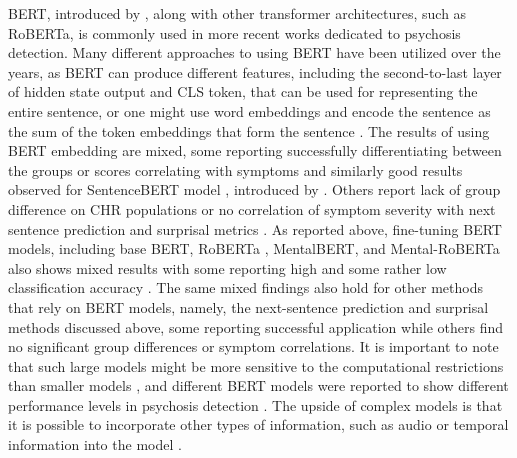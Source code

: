 BERT, introduced by \citet{devlin2018bert}, along with other transformer architectures, such as RoBERTa, is commonly used in more recent works dedicated to psychosis detection. Many different approaches to using BERT have been utilized over the years, as BERT can produce different features, including the second-to-last layer of hidden state output and CLS token, that can be used for representing the entire sentence, or one might use word embeddings and encode the sentence as the sum of the token embeddings that form the sentence \citep{xu2022fully}. The results of using BERT embedding are mixed, some reporting successfully differentiating between the groups or scores correlating with symptoms \citep{ryazanskaya2020automated, xu2022fully, srivastava2022p473} and similarly good results observed for SentenceBERT model \citep{xu2022fully}, introduced by \citet{reimers2019sentence}. Others report lack of group difference on CHR populations \citep{hitczenko2021understanding, bilgrami2022construct} or no correlation of symptom severity with next sentence prediction and surprisal metrics \citep{jeong2023exploring}. As reported above, fine-tuning BERT models, including base BERT, RoBERTa \citep{liu2019roberta}, MentalBERT, and Mental-RoBERTa \citep{ji2021mentalbert} also shows mixed results with some reporting high \citep{wouts2021belabbert, shriki2022masking} and some rather low classification accuracy \citep{aich2022towards}. The same mixed findings also hold for other methods that rely on BERT models, namely, the next-sentence prediction and surprisal methods discussed above, some reporting successful application while others find no significant group differences or symptom correlations. It is important to note that such large models might be more sensitive to the computational restrictions than smaller models \citep{kaplan2020scaling}, and different BERT models were reported to show different performance levels in psychosis detection \citep{aich2022towards}. The upside of complex models is that it is possible to incorporate other types of information, such as audio or temporal information into the model \citep{xu2022fully, wouts2021belabbert}.


